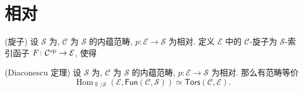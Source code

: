 \chapter{相对\topos{}}

\minitoc

\begin{definition}
	{(旋子)}
	设 $\mathcal S$ 为\topos{}, $\mathcal C$ 为 $\mathcal S$ 的内蕴范畴, $p\colon \mathcal E\to\mathcal S$ 为相对\topos{}. 定义 $\mathcal E$ 中的 $\mathcal C$-旋子为 $\mathcal S$-索引函子 $F\colon \mathcal C^{\text{op}}\to\mathcal E$, 使得
\end{definition}

\begin{prop}
	{(Diaconescu 定理)}
	设 $\mathcal S$ 为\topos{}, $\mathcal C$ 为 $\mathcal S$ 的内蕴范畴, $p\colon \mathcal E\to\mathcal S$ 为相对\topos{}. 那么有范畴等价
	\[
	\operatorname{Hom}_{\Top/\mathcal S}
	(\mathcal E,\mathsf {Fun}(\mathcal C,\mathcal S))
	\simeq \mathsf {Tors}(\mathcal C,\mathcal E).
	\]
\end{prop}

